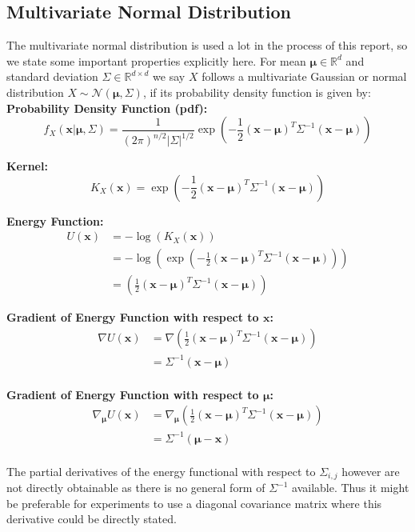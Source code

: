 \subsection{Multivariate Normal Distribution}

The multivariate normal distribution is used a lot in the process of this report, so we state some important properties explicitly here.
For mean $\bm{\mu} \in \mathbb{R}^d$ and standard deviation $\Sigma \in \mathbb{R}^{d \times d}$ we say $X$ follows a multivariate Gaussian 
or normal distribution $X \sim \mathcal{N}(\bm{\mu}, \Sigma)$, if its probability density function is given by:
\textbf{Probability Density Function (pdf):}
\[
	f_X(\bm{x} | \bm{\mu}, \Sigma) = \frac{1}{(2\pi)^{n/2}|\Sigma|^{1/2}} \exp\left(-\frac{1}{2} (\bm{x} - \bm{\mu})^T \Sigma^{-1} (\bm{x} - \bm{\mu})\right)
\]

\textbf{Kernel:}
\[
	K_X (\bm{x}) = \exp \left( -\frac{1}{2} (\bm{x} - \bm{\mu})^T \Sigma^{-1} (\bm{x} - \bm{\mu}) \right)
\]

\textbf{Energy Function:}
\[
\begin{aligned}
	U(\bm{x}) &= - \log( K_X (\bm{x}) ) \\
	&= - \log( \exp \left( -\frac{1}{2} (\bm{x} - \bm{\mu})^T \Sigma^{-1} (\bm{x} - \bm{\mu}) \right) ) \\
	&= \left( \frac{1}{2} (\bm{x} - \bm{\mu})^T \Sigma^{-1} (\bm{x} - \bm{\mu}) \right)
\end{aligned}
\]

\textbf{Gradient of Energy Function with respect to $\bm{x}$:}
\[
\begin{aligned}
	\nabla U(\bm{x}) &= \nabla \left( \frac{1}{2} (\bm{x} - \bm{\mu})^T \Sigma^{-1} (\bm{x} - \bm{\mu}) \right) \\
	&= \Sigma^{-1} (\bm{x} - \bm{\mu}) \\
\end{aligned}
\]

\textbf{Gradient of Energy Function with respect to $\bm{\mu}$:}
\[
\begin{aligned}
	\nabla_{\bm{\mu}} U(\bm{x}) &= \nabla_{\bm{\mu}} \left( \frac{1}{2} (\bm{x} - \bm{\mu})^T \Sigma^{-1} (\bm{x} - \bm{\mu}) \right) \\
	&= \Sigma^{-1} (\bm{\mu} - \bm{x}) \\
\end{aligned}
\]

The partial derivatives of the energy functional with respect to $\Sigma_{i,j}$ however are not directly obtainable as there is no general form of $\Sigma^{-1}$ available.
Thus it might be preferable for experiments to use a diagonal covariance matrix where this derivative could be directly stated.


